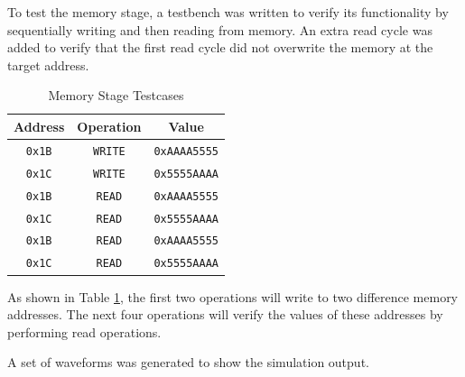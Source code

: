\documentclass[CMPE]{../KGCOEReport}
\def\code#1{\texttt{#1}}
\begin{document}
    To test the memory stage, a testbench was written to verify its functionality
    by sequentially writing and then reading from memory. An extra read cycle
    was added to verify that the first read cycle did not overwrite the memory
    at the target address.
    
    \begin{table}[H]
        \renewcommand{\arraystretch}{1.2}
        \setlength{\tabcolsep}{12pt}
        \caption{Memory Stage Testcases}
        \begin{center}
            \begin{tabular}{|c|c|c|}
                \hline
				Address & Operation & Value\\\hline

				\code{0x1B} & \code{WRITE} & \code{0xAAAA5555}\\\hline
				\code{0x1C} & \code{WRITE} & \code{0x5555AAAA}\\\hline
				\code{0x1B} & \code{READ} & \code{0xAAAA5555}\\\hline
				\code{0x1C} & \code{READ} & \code{0x5555AAAA}\\\hline
				\code{0x1B} & \code{READ} & \code{0xAAAA5555}\\\hline
				\code{0x1C} & \code{READ} & \code{0x5555AAAA}\\\hline

            \end{tabular}
        \end{center}
        \label{tab:mem}
    \end{table}
    
    As shown in Table \ref{tab:mem}, the first two operations will write
    to two difference memory addresses. The next four operations will verify
    the values of these addresses by performing read operations.
    
    A set of waveforms was generated to show the simulation output.
    
\end{document}
